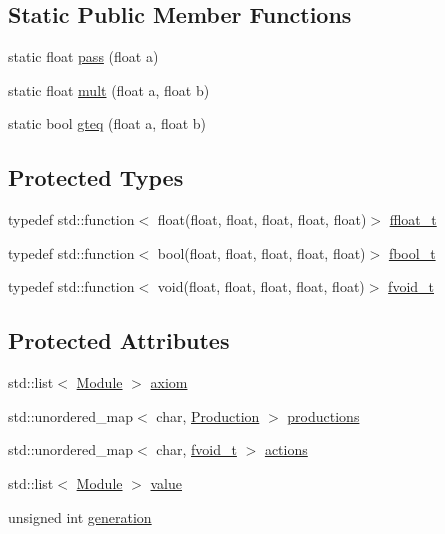 \subsection*{Static Public Member Functions}
\begin{DoxyCompactItemize}
\item 
static float \hyperlink{class_p_l_s_a7a289ddec2b417d62e6137b798e1258f}{pass} (float a)
\item 
static float \hyperlink{class_p_l_s_a0437a3e9ba5cd3682573165ccc1fbf9c}{mult} (float a, float b)
\item 
static bool \hyperlink{class_p_l_s_ac8298e4b5940dae6c48e1dc042d4d8aa}{gteq} (float a, float b)
\end{DoxyCompactItemize}
\subsection*{Protected Types}
\begin{DoxyCompactItemize}
\item 
typedef std\+::function$<$ float(float, float, float, float, float)$>$ \hyperlink{class_p_l_s_a001f46380d29f9a3703cc78ee928b244}{ffloat\+\_\+t}
\item 
typedef std\+::function$<$ bool(float, float, float, float, float)$>$ \hyperlink{class_p_l_s_ae518559a64636a22c6e5f5eaa82cc420}{fbool\+\_\+t}
\item 
typedef std\+::function$<$ void(float, float, float, float, float)$>$ \hyperlink{class_p_l_s_a2c9371dd235f3c41295d15c92ac9f33b}{fvoid\+\_\+t}
\end{DoxyCompactItemize}
\subsection*{Protected Attributes}
\begin{DoxyCompactItemize}
\item 
std\+::list$<$ \hyperlink{class_p_l_s_1_1_module}{Module} $>$ \hyperlink{class_p_l_s_a5de46c72cd9ef4006f7f1ed43ac028c1}{axiom}
\item 
std\+::unordered\+\_\+map$<$ char, \hyperlink{class_p_l_s_1_1_production}{Production} $>$ \hyperlink{class_p_l_s_a2bdf324e0d0ed4e1c3265d4029f83f0b}{productions}
\item 
std\+::unordered\+\_\+map$<$ char, \hyperlink{class_p_l_s_a2c9371dd235f3c41295d15c92ac9f33b}{fvoid\+\_\+t} $>$ \hyperlink{class_p_l_s_a5d7bf41cb569c111be4899bd7904a0da}{actions}
\item 
std\+::list$<$ \hyperlink{class_p_l_s_1_1_module}{Module} $>$ \hyperlink{class_p_l_s_adf032e0f090c28370850ee026375f826}{value}
\item 
unsigned int \hyperlink{class_p_l_s_a056f4e66546bc58aaa68f68b6ac0e902}{generation}
\end{DoxyCompactItemize}


